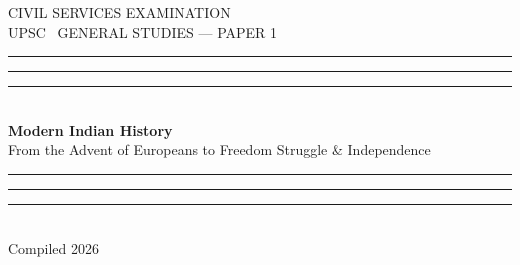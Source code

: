 \documentclass[11pt,a4paper,twoside,openright]{book}
\newcommand{\BookExamEyebrow}{CIVIL SERVICES EXAMINATION}
\newcommand{\BookExamLine}{UPSC \textbullet\ GENERAL STUDIES --- PAPER 1}
\newcommand{\BookTitle}{Modern Indian History}
\newcommand{\BookSubtitle}{From the Advent of Europeans to Freedom Struggle \& Independence}
\newcommand{\BookDate}{2026}
\begin{document}

\begin{titlepage}
\begin{center}
\vspace*{2.2cm}
{\color{Grey}\sffamily\fontsize{9.5}{12}\selectfont\MakeUppercase{\BookExamEyebrow}}\\[12pt]
{\color{Ink}\sffamily\fontsize{10.5}{13}\selectfont \BookExamLine}\\[40pt]
\textcolor{AccentWarm}{\rule{0.08\textwidth}{2pt}}\hspace{6pt}%
\textcolor{Accent}{\rule{0.05\textwidth}{2pt}}\hspace{6pt}%
\textcolor{Hairline}{\rule{0.03\textwidth}{2pt}}\\[28pt]
{\color{Accent}\sffamily\bfseries\fontsize{28}{34}\selectfont \BookTitle}\\[12pt]
{\color{Grey}\sffamily\fontsize{14}{18}\selectfont \BookSubtitle}\\[36pt]
\textcolor{Hairline}{\rule{0.03\textwidth}{2pt}}\hspace{6pt}%
\textcolor{Accent}{\rule{0.05\textwidth}{2pt}}\hspace{6pt}%
\textcolor{AccentWarm}{\rule{0.08\textwidth}{2pt}}\\[28pt]
{\sffamily\fontsize{9.5}{12}\selectfont\color{Grey} Compiled \BookDate}
\vfill
\vspace*{1.8cm}
\end{center}
\end{titlepage}

\clearpage
{}
\setcounter{page}{1}
\tableofcontents\label{toc}
\thispagestyle{plain}
\clearpage



% 
% 
% 
% 
% 
% 
% 
% 
% 
% 
% 
% 
% 
% 
% 
% 
% 
\end{document}
